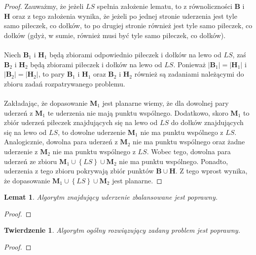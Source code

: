 \documentclass[10pt,a4paper]{article}
\newtheorem{theorem}{Twierdzenie}
\newtheorem{lemma}{Lemat}
\begin{document}
	\begin{proof}
		Zauważmy, że jeżeli $LS$ spełnia założenie lematu, to z równoliczności $\mathbf{B}$ i $\mathbf{H}$ oraz z tego założenia wynika, że jeżeli po jednej stronie uderzenia jest tyle samo piłeczek, co dołków, to po drugiej stronie również jest tyle samo piłeczek, co dołków (gdyż, w sumie, również musi być tyle samo piłeczek, co dołków). \\~\\
		Niech $\mathbf{B}_{1}$ i $\mathbf{H}_{1}$ będą zbiorami odpowiednio piłeczek i dołków na lewo od $LS$, zaś $\mathbf{B}_{2}$ i $\mathbf{H}_{2}$ będą zbiorami piłeczek i dołków na lewo od $LS$. Ponieważ $|\mathbf{B}_{1}| = |\mathbf{H}_{1}|$ i $|\mathbf{B}_{2}| = |\mathbf{H}_{2}|$, to pary $\mathbf{B}_{1}$ i $\mathbf{H}_{1}$ oraz $\mathbf{B}_{2}$ i $\mathbf{H}_{2}$ również są zadaniami należącymi do zbioru zadań rozpatrywanego problemu. \\~\\
		Zakładając, że dopasowanie $\mathbf{M}_{1}$ jest planarne wiemy, że dla dowolnej pary uderzeń z $\mathbf{M}_{1}$ te uderzenia nie mają punktu wspólnego. Dodatkowo, skoro $\mathbf{M}_{1}$ to zbiór uderzeń piłeczek znajdujących się na lewo od $LS$ do dołków znajdujących się na lewo od $LS$, to dowolne uderzenie $\mathbf{M}_{1}$ nie ma punktu wspólnego z $LS$. Analogicznie, dowolna para uderzeń z $\mathbf{M}_{2}$ nie ma punktu wspólnego oraz żadne uderzenie z $\mathbf{M}_{2}$ nie ma punktu wspólnego z $LS$. Wobec tego, dowolna para uderzeń ze zbioru $\mathbf{M}_{1} \cup \left\{LS\right\} \cup \mathbf{M}_{2}$ nie ma punktu wspólnego. Ponadto, uderzenia z tego zbioru pokrywają zbiór punktów $\mathbf{B} \cup \mathbf{H}$. Z tego wprost wynika, że dopasowanie $\mathbf{M}_{1} \cup \left\{LS\right\} \cup \mathbf{M}_{2}$	jest planarne.
	\end{proof}

	\begin{lemma}
		Algorytm znajdujący uderzenie zbalansowane jest poprawny.
	\end{lemma}

	\begin{proof}
	\end{proof}

	\begin{theorem}
		Algorytm ogólny rozwiązujący zadany problem jest poprawny.
	\end{theorem}
	
	\begin{proof}
	\end{proof}
\end{document}
